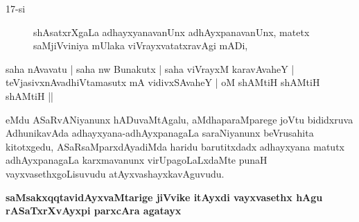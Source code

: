 \begin{description}
\item[17-si] shAsatxrXgaLa adhayxyanavanUnx adhAyxpanavanUnx, matetx saMjiVviniya mUlaka viVrayxvatatxravAgi mADi,
\end{description}
\begin{shloka}
saha nAvavatu | saha nw Bunakutx | saha viVrayxM karavAvaheY |\\\label{46a}
teVjasivxnAvadhiVtamasutx mA vidivxSAvaheY | oM shAMtiH shAMtiH shAMtiH ||
\end{shloka}
\smallskip

\noindent
eMdu ASaRvANiyanunx hADuvaMtAgalu, aMdhaparaMparege joVtu bididxruva AdhunikavAda adhayxyana-adhAyxpanagaLa saraNiyanunx beVrusahita kitotxgedu, ASaRsaMparxdAyadiMda haridu barutitxdadx adhayxyana matutx adhAyxpanagaLa karxmavanunx virUpagoLaLxdaMte punaH vayxvasethxgoLisuvudu atAyxvashayxkavAguvudu.

{\bigskip
\noindent
{\large\bf saMsakxqqtavidAyxvaMtarige jiVvike itAyxdi vayxvasethx hAgu rASaTxrXvAyxpi parxcAra agatayx}}\label{page46}

